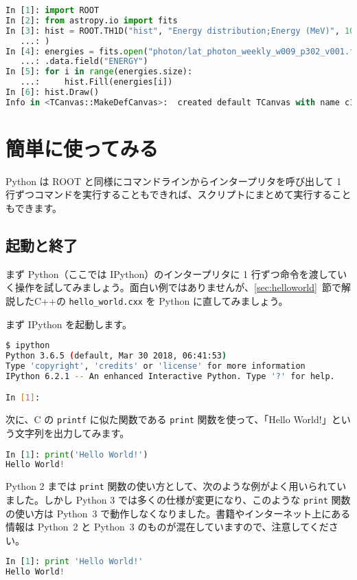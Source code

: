 \begin{lstlisting}[language=python]
In [1]: import ROOT
In [2]: from astropy.io import fits 
In [3]: hist = ROOT.TH1D("hist", "Energy distribution;Energy (MeV)", 100, 0, 1e3
   ...: )
In [4]: energies = fits.open("photon/lat_photon_weekly_w009_p302_v001.fits")[1]
   ...: .data.field("ENERGY")
In [5]: for i in range(energies.size):
   ...:     hist.Fill(energies[i])
In [6]: hist.Draw()
Info in <TCanvas::MakeDefCanvas>:  created default TCanvas with name c1
\end{lstlisting}

\section{簡単に使ってみる}
Python は ROOT と同様にコマンドラインからインタープリタを呼び出して 1 行ずつコマンドを実行することもできれば、スクリプトにまとめて実行することもできます。

\subsection{起動と終了}
まず Python（ここでは IPython）のインタープリタに 1 行ずつ命令を渡していく操作を試してみましょう。面白い例ではありませんが、\ref{sec:helloworld}~節で解説したC++の \texttt{hello\_world.cxx} を Python に直してみましょう。

まず IPython を起動します。

\begin{lstlisting}[language=bash]
$ ipython
Python 3.6.5 (default, Mar 30 2018, 06:41:53) 
Type 'copyright', 'credits' or 'license' for more information
IPython 6.2.1 -- An enhanced Interactive Python. Type '?' for help.

In [1]: 
\end{lstlisting}

次に、C の \texttt{printf} に似た関数である \texttt{print} 関数を使って、「Hello World!」という文字列を出力してみます。
\begin{lstlisting}[language=python]
In [1]: print('Hello World!')
Hello World!
\end{lstlisting}

Python 2 までは \texttt{print} 関数の使い方として、次のような例がよく用いられていました。しかし Python 3 では多くの仕様が変更になり、このような \texttt{print} 関数の使い方は Python~3 で動作しなくなりました。書籍やインターネット上にある情報は Python~2 と Python~3 のものが混在していますので、注意してください。

\begin{lstlisting}[language=python]
In [1]: print 'Hello World!'
Hello World!
\end{lstlisting}


